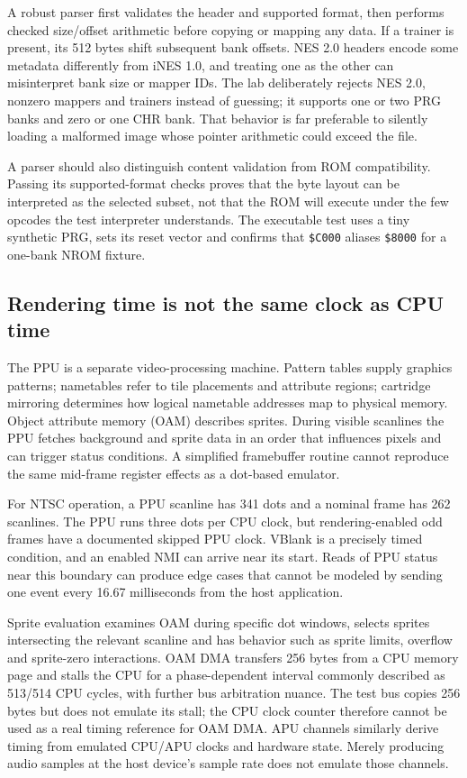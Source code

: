 A robust parser first validates the header and supported format, then performs checked size/offset arithmetic before copying or mapping any data. If a trainer is present, its 512 bytes shift subsequent bank offsets. NES 2.0 headers encode some metadata differently from iNES 1.0, and treating one as the other can misinterpret bank size or mapper IDs. The lab deliberately rejects NES 2.0, nonzero mappers and trainers instead of guessing; it supports one or two PRG banks and zero or one CHR bank. That behavior is far preferable to silently loading a malformed image whose pointer arithmetic could exceed the file.

A parser should also distinguish content validation from ROM compatibility. Passing its supported-format checks proves that the byte layout can be interpreted as the selected subset, not that the ROM will execute under the few opcodes the test interpreter understands. The executable test uses a tiny synthetic PRG, sets its reset vector and confirms that \texttt{\$C000} aliases \texttt{\$8000} for a one-bank NROM fixture.

\subsection{Rendering time is not the same clock as CPU time}\label{rendering-time-is-not-the-same-clock-as-cpu-time}

The PPU is a separate video-processing machine. Pattern tables supply graphics patterns; nametables refer to tile placements and attribute regions; cartridge mirroring determines how logical nametable addresses map to physical memory. Object attribute memory (OAM) describes sprites. During visible scanlines the PPU fetches background and sprite data in an order that influences pixels and can trigger status conditions. A simplified framebuffer routine cannot reproduce the same mid-frame register effects as a dot-based emulator.

For NTSC operation, a PPU scanline has 341 dots and a nominal frame has 262 scanlines. The PPU runs three dots per CPU clock, but rendering-enabled odd frames have a documented skipped PPU clock. VBlank is a precisely timed condition, and an enabled NMI can arrive near its start. Reads of PPU status near this boundary can produce edge cases that cannot be modeled by sending one event every 16.67 milliseconds from the host application.

Sprite evaluation examines OAM during specific dot windows, selects sprites intersecting the relevant scanline and has behavior such as sprite limits, overflow and sprite-zero interactions. OAM DMA transfers 256 bytes from a CPU memory page and stalls the CPU for a phase-dependent interval commonly described as 513/514 CPU cycles, with further bus arbitration nuance. The test bus copies 256 bytes but does not emulate its stall; the CPU clock counter therefore cannot be used as a real timing reference for OAM DMA. APU channels similarly derive timing from emulated CPU/APU clocks and hardware state. Merely producing audio samples at the host device's sample rate does not emulate those channels.

